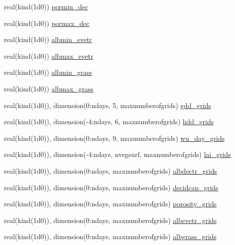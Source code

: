 \begin{DoxyCompactItemize}
real(kind(1d0)) \hyperlink{namespaceallocatearray_ac4df536a53bb496d38aca9441ccf18f6}{pormin\+\_\+dec}
\item 
real(kind(1d0)) \hyperlink{namespaceallocatearray_a077f163b1bb6fc5d136d362575a1294e}{pormax\+\_\+dec}
\item 
real(kind(1d0)) \hyperlink{namespaceallocatearray_afcc1bdcc6f5b7852565fb1489a7c4580}{albmin\+\_\+evetr}
\item 
real(kind(1d0)) \hyperlink{namespaceallocatearray_ad0dd8a369c80ba1304fb195ba4fc0ec6}{albmax\+\_\+evetr}
\item 
real(kind(1d0)) \hyperlink{namespaceallocatearray_a1dd0b37af5b6a2ba51c098d07cb6a3bc}{albmin\+\_\+grass}
\item 
real(kind(1d0)) \hyperlink{namespaceallocatearray_ac423a128522b5c306be8442abe8257cd}{albmax\+\_\+grass}
\item 
real(kind(1d0)), dimension(0\+:ndays, 5, maxnumberofgrids) \hyperlink{namespaceallocatearray_a8102d2a0006650f97b2b240a515fffac}{gdd\+\_\+grids}
\item 
real(kind(1d0)), dimension(-\/4\+:ndays, 6, maxnumberofgrids) \hyperlink{namespaceallocatearray_a611f940db5f9be9de91624d968683688}{hdd\+\_\+grids}
\item 
real(kind(1d0)), dimension(0\+:ndays, 9, maxnumberofgrids) \hyperlink{namespaceallocatearray_a979667a8feb8a3b2e63bedfbb7e25972}{wu\+\_\+day\+\_\+grids}
\item 
real(kind(1d0)), dimension(-\/4\+:ndays, nvegsurf, maxnumberofgrids) \hyperlink{namespaceallocatearray_a03eaebbd64063714bff3eaac0920e483}{lai\+\_\+grids}
\item 
real(kind(1d0)), dimension(0\+:ndays, maxnumberofgrids) \hyperlink{namespaceallocatearray_a1aa983c3d70fa00f3ff15a9eee247852}{albdectr\+\_\+grids}
\item 
real(kind(1d0)), dimension(0\+:ndays, maxnumberofgrids) \hyperlink{namespaceallocatearray_a346cb07a7ef17556940b2325e8d43cf5}{decidcap\+\_\+grids}
\item 
real(kind(1d0)), dimension(0\+:ndays, maxnumberofgrids) \hyperlink{namespaceallocatearray_a904d246737e2626f58f7392e4c610372}{porosity\+\_\+grids}
\item 
real(kind(1d0)), dimension(0\+:ndays, maxnumberofgrids) \hyperlink{namespaceallocatearray_a052b2b45bd4ba25496922415f3af59b3}{albevetr\+\_\+grids}
\item 
real(kind(1d0)), dimension(0\+:ndays, maxnumberofgrids) \hyperlink{namespaceallocatearray_ab69cb9f5e7236e8417d44a2b47a543d5}{albgrass\+\_\+grids}

\end{DoxyCompactItemize}
